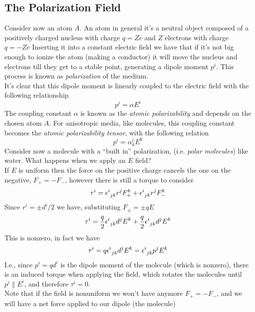 \documentclass[../electromagnetism]{subfiles}
\begin{document}
\subsection{The Polarization Field}
Consider now an atom $A$. An atom in general it's a neutral object composed of a positively charged nucleus with charge $q=Ze$ and $Z$ electrons with charge $q=-Ze$ Inserting it into a constant electric field we have that if it's not big enough to ionize the atom (making a conductor) it will move the nucleus and electrons till they get to a stable point, generating a dipole moment $p^i$. This process is known as \textit{polarization} of the medium.\\
It's clear that this dipole moment is linearly coupled to the electric field with the following relationship
\begin{equation}
	p^i=\alpha E^i
	\label{eq:atompol}
\end{equation}
The coupling constant $\alpha$ is known as the \textit{atomic polarizability} and depends on the chosen atom $A$. For anisotropic media, like molecules, this coupling constant becomes the \textit{atomic polarizability tensor}, with the following relation
\begin{equation}
	p^i=\alpha^i_kE^k
	\label{eq:atompoltensor}
\end{equation}
Consider now a molecule with a ``built in'' polarization, (i.e. \textit{polar molecules}) like water. What happens when we apply an $E$ field?\\
If $E$ is uniform then the force on the positive charge cancels the one on the negative, $F_+=-F_-$, however there is still a torque to consider
\begin{equation}
	\tau^i=\epsilon^{i}_{\ jk}r^jF^k_++\epsilon^{i}_{\ jk}r^jF^k_-
	\label{eq:torquemol}
\end{equation}
Since $r^i=\pm d^i/2$ we have, substituting $F_{\pm}=\pm qE$
\begin{equation*}
	\tau^i=\frac{q}{2}\epsilon^{i}_{\ jk}d^jE^k+\frac{q}{2}\epsilon^{i}_{\ jk}d^jE^k
\end{equation*}
This is nonzero, in fact we have
\begin{equation}
	\tau^i=q\epsilon^{i}_{\ jk}d^jE^k=\epsilon^{i}_{\ jk}p^jE^k
	\label{eq:indtorq}
\end{equation}
I.e., since $p^i=qd^i$ is the dipole moment of the molecule (which is nonzero), there is an induced torque when applying the field, which rotates the molecules until $p^i\parallel E^i$, and therefore $\tau^i=0$.\\
Note that if the field is nonuniform we won't have anymore $F_+=-F_-$, and we will have a net force applied to our dipole (the molecule)
\end{document}

